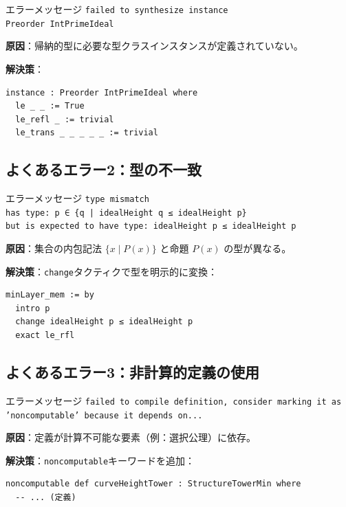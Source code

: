 \documentclass{ltjsarticle}
\begin{document}
\begin{warnbox}{エラーメッセージ}
\texttt{failed to synthesize instance\\
\quad Preorder IntPrimeIdeal}
\end{warnbox}

\textbf{原因}：帰納的型に必要な型クラスインスタンスが定義されていない。

\textbf{解決策}：
\begin{lstlisting}
instance : Preorder IntPrimeIdeal where
  le _ _ := True
  le_refl _ := trivial
  le_trans _ _ _ _ _ := trivial
\end{lstlisting}

\subsection{よくあるエラー2：型の不一致}

\begin{warnbox}{エラーメッセージ}
\texttt{type mismatch\\
\quad has type: p ∈ \{q | idealHeight q ≤ idealHeight p\}\\
\quad but is expected to have type: idealHeight p ≤ idealHeight p}
\end{warnbox}

\textbf{原因}：集合の内包記法 $\{x \mid P(x)\}$ と命題 $P(x)$ の型が異なる。

\textbf{解決策}：\texttt{change}タクティクで型を明示的に変換：
\begin{lstlisting}
minLayer_mem := by
  intro p
  change idealHeight p ≤ idealHeight p
  exact le_rfl
\end{lstlisting}

\subsection{よくあるエラー3：非計算的定義の使用}

\begin{warnbox}{エラーメッセージ}
\texttt{failed to compile definition, consider marking it as\\
'noncomputable' because it depends on...}
\end{warnbox}

\textbf{原因}：定義が計算不可能な要素（例：選択公理）に依存。

\textbf{解決策}：\texttt{noncomputable}キーワードを追加：
\begin{lstlisting}
noncomputable def curveHeightTower : StructureTowerMin where
  -- ... (定義)
\end{lstlisting}
\end{document}
